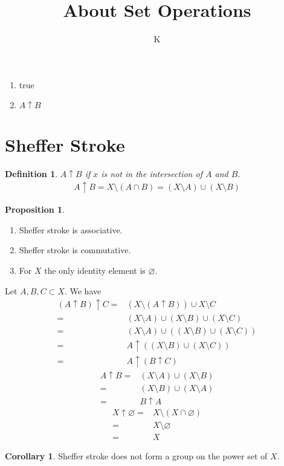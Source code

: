 \documentclass[a4paper]{article}
\title{About Set Operations}
\author{K}
\theoremstyle{definition}
\newtheorem{definition}{Definition}[section]
\newtheorem{corollary}{Corollary}
\newtheorem{proposition}{Proposition}[definition]
\begin{document}
\begin{enumerate}
  \item true
  \item \(A \uparrow B\)
\end{enumerate}
%
\section{Sheffer Stroke}
\begin{definition}
  \textit{\(A \uparrow B\) if \(x\) is not in the intersection of \(A\) and \(B\).}
  \begin{align}
    A \uparrow B = X \setminus (A \cap B) = (X \setminus A) \cup (X \setminus B)
  \end{align}
\end{definition}
%
\begin{proposition}
  \begin{enumerate}
    \item Sheffer stroke is associative.
    \item Sheffer stroke is commutative.
    \item For \(X\) the only identity element is \(\varnothing\).
  \end{enumerate}
\end{proposition}
\begin{Proof}
  Let \(A, B, C \subset X\). We have
  \begin{align}
    (A \uparrow B) \uparrow C =& (X \setminus (A \uparrow B)) \cup X \setminus C \\
    =& (X \setminus A) \cup (X \setminus B) \cup (X \setminus C) \\
    =& (X \setminus A) \cup ((X \setminus B) \cup (X \setminus C)) \\
    =& A \uparrow ((X \setminus B) \cup (X \setminus C)) \\
    =& A \uparrow (B \uparrow C)
  \end{align}
  \begin{align}
    A \uparrow B =& (X \setminus A) \cup (X \setminus B) \\
    =& (X \setminus B) \cup (X \setminus A) \\
    =& B \uparrow A
  \end{align}
  \begin{align}
    X \uparrow \varnothing =& X \setminus (X \cap \varnothing) \\
    =& X \setminus \varnothing \\
    =& X
  \end{align}
\end{Proof}
\begin{corollary}
  Sheffer stroke does not form a group on the power set of \(X\).
\end{corollary}
%
\end{document}
